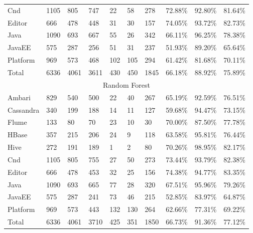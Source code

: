 \begin{table}[]
{\begin{tabular}{llllllllll}
Cnd & 1105 & 805 & 747 & 22 & 58 & 278 & 72.88\% & 92.80\% & 81.64\% \\
Editor & 666 & 478 & 448 & 31 & 30 & 157 & 74.05\% & 93.72\% & 82.73\% \\
Java & 1090 & 693 & 667 & 55 & 26 & 342 & 66.11\% & 96.25\% & 78.38\% \\
JavaEE & 575 & 287 & 256 & 51 & 31 & 237 & 51.93\% & 89.20\% & 65.64\% \\
Platform & 969 & 573 & 468 & 102 & 105 & 294 & 61.42\% & 81.68\% & 70.11\% \\
Total & 6336 & 4061 & 3611 & 430 & 450 & 1845 & 66.18\% & 88.92\% & 75.89\% \\ \hline
\multicolumn{10}{c}{Random Forest} \\ \hline
Ambari & 829 & 540 & 500 & 22 & 40 & 267 & 65.19\% & 92.59\% & 76.51\% \\
Cassandra & 340 & 199 & 188 & 14 & 11 & 127 & 59.68\% & 94.47\% & 73.15\% \\
Flume & 133 & 80 & 70 & 23 & 10 & 30 & 70.00\% & 87.50\% & 77.78\% \\
HBase & 357 & 215 & 206 & 24 & 9 & 118 & 63.58\% & 95.81\% & 76.44\% \\
Hive & 272 & 191 & 189 & 1 & 2 & 80 & 70.26\% & 98.95\% & 82.17\% \\
Cnd & 1105 & 805 & 755 & 27 & 50 & 273 & 73.44\% & 93.79\% & 82.38\% \\
Editor & 666 & 478 & 453 & 32 & 25 & 156 & 74.38\% & 94.77\% & 83.35\% \\
Java & 1090 & 693 & 665 & 77 & 28 & 320 & 67.51\% & 95.96\% & 79.26\% \\
JavaEE & 575 & 287 & 241 & 73 & 46 & 215 & 52.85\% & 83.97\% & 64.87\% \\
Platform & 969 & 573 & 443 & 132 & 130 & 264 & 62.66\% & 77.31\% & 69.22\% \\
Total & 6336 & 4061 & 3710 & 425 & 351 & 1850 & 66.73\% & 91.36\% & 77.12\% \\ \hline
\end{tabular}%
}
\end{table}